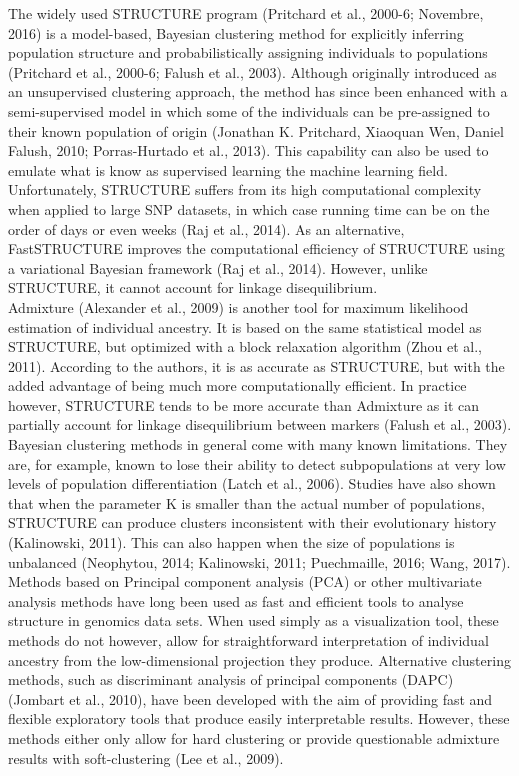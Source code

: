 \documentclass[final]{bioinfo}
\begin{document}
The widely used STRUCTURE program (Pritchard et al., 2000-6; Novembre, 2016) is a model-based, Bayesian clustering method for explicitly inferring population structure and probabilistically assigning individuals to  populations (Pritchard et al., 2000-6; Falush et al., 2003). Although originally introduced as an unsupervised clustering approach, the method has since been enhanced with a semi-supervised model in which some of the individuals can be pre-assigned to their known population of origin (Jonathan K. Pritchard, Xiaoquan Wen, Daniel Falush, 2010; Porras-Hurtado et al., 2013). This capability can also be used to emulate what is know as supervised learning the machine learning field. Unfortunately, STRUCTURE suffers from its high computational complexity when applied to large SNP datasets, in which case running time can be on the order of days or even weeks (Raj et al., 2014). As an alternative, FastSTRUCTURE improves the computational efficiency of STRUCTURE using a variational Bayesian framework (Raj et al., 2014). However, unlike STRUCTURE, it cannot account for linkage disequilibrium.\\
Admixture (Alexander et al., 2009) is another tool for maximum likelihood estimation of individual ancestry. It is based on the same statistical model as STRUCTURE, but optimized with a block relaxation algorithm (Zhou et al., 2011). According to the authors, it is as accurate as STRUCTURE, but with the added advantage of being much more computationally efficient. In practice however, STRUCTURE tends to be more accurate than Admixture as it can partially account for linkage disequilibrium between markers (Falush et al., 2003).\\
Bayesian clustering methods in general come with many known limitations. They are, for example, known to lose their ability to detect subpopulations at very low levels of population differentiation (Latch et al., 2006). Studies have also shown that when the parameter K is smaller than the actual number of populations, STRUCTURE can produce clusters inconsistent with their evolutionary history (Kalinowski, 2011). This can also happen when the size of populations is unbalanced (Neophytou, 2014; Kalinowski, 2011; Puechmaille, 2016; Wang, 2017).\\
Methods based on Principal component analysis (PCA) or other multivariate analysis methods have long been used as fast and efficient tools to analyse structure in genomics data sets. When used simply as a visualization tool, these methods do not however, allow for straightforward interpretation of individual ancestry from the low-dimensional projection they produce. Alternative clustering methods, such as discriminant analysis of principal components (DAPC) (Jombart et al., 2010), have been developed with the aim of providing fast and flexible exploratory tools that produce easily interpretable results. However, these methods either only allow for hard clustering or provide questionable admixture results with soft-clustering (Lee et al., 2009).\\
\end{document}
